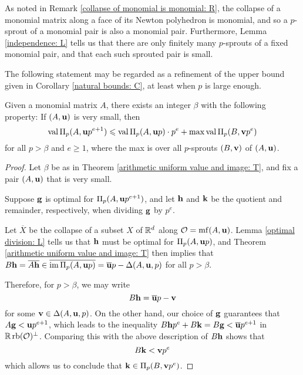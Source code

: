 \documentclass[11pt]{amsart}
\renewcommand{\!}[1]{{\color{red}\text{$\star$\,}#1\,$\star$}}
\newcommand{\ol}[1]{\overline{#1}}
\begin{document}
\begin{remark}
\label{p-sprout: R} 
As noted in Remark \ref{collapse of monomial is monomial: R}, the collapse of a monomial matrix along a face of its Newton polyhedron is monomial, and so a $p$-sprout of a monomial pair is also a monomial pair.  Furthermore,   Lemma \ref{independence: L} tells us that there are only finitely many $p$-sprouts of a fixed monomial pair, and that each such sprouted pair is small. 
 \end{remark}

The following statement may be regarded as a refinement of the upper bound given in Corollary \ref{natural bounds: C}, at least when $p$ is large enough.

\begin{corollary}
Given a monomial matrix $A$, there exists an integer $\beta$ with the following property:  If $(A, \mathbf{u})$ is very small, then
%
\[ \operatorname{val} \Pi_p(A, \mathbf{u}p^{e+1})  \leqslant  \operatorname{val} \Pi_p(A, \mathbf{u}p) \cdot p^e +  \max \operatorname{val} \Pi_p(B, \mathbf{v}p^e) \] 
%
for all $p > \beta$ and $e \geq 1$, where the max is over all $p$-sprouts $(B, \mathbf{v})$ of $(A, \mathbf{u})$.  
\end{corollary}

\begin{proof}  Let $\beta$ be as in Theorem \ref{arithmetic uniform value and image: T}, and fix a pair $(A, \mathbf{u})$ that is very small.


Suppose $\mathbf{g}$ is optimal for $\Pi_p(A, \mathbf{u}p^{e+1})$, and let $\mathbf{h}$ and $\mathbf{k}$ be the quotient and remainder, respectively, when dividing $\mathbf{g}$ by $p^e$.

Let $\ol{X}$ be the collapse of a subset $X$ of $\mathbb{R}^d$ along $\mathcal{O} = \operatorname{mf}(A, \mathbf{u})$.  Lemma \ref{optimal division: L} tells us that $\mathbf{h}$ must be optimal for $\Pi_p(A, \mathbf{u}p)$, and Theorem \ref{arithmetic uniform value and image: T} then implies that $B \vv{h} = \ol{A \vv{h}} \in \ol{\im \IP_p(A, \vv{u}p)} = \ol{\vv{u}}p - \Delta(A, \vv{u}, p)$ for all $p > \beta$.   

Therefore, for $p > \beta$, we may write \[ B \vv{h} = \ol{\vv{u}}p - \vv{v}\] for some $\mathbf{v} \in \Delta(A, \mathbf{u}, p)$.  On the other hand, our choice of $\mathbf{g}$ guarantees that $A \mathbf{g} < \mathbf{u}p^{e+1}$, which leads to the inequality $B \vv{h} p^e + B \vv{k} = B \vv{g} <  \ol{\vv{u}}p^{e+1}$  in $\mathbb{R} \operatorname{rb}(\mathcal{O})^{\perp}$.  Comparing this with the above description of $B \mathbf{h}$ shows that \[ B \mathbf{k} < \mathbf{v} p^e \] which allows us to conclude that $\mathbf{k} \in \Pi_p(B, \mathbf{v} p^e)$.  %
\end{proof}
\end{document}

